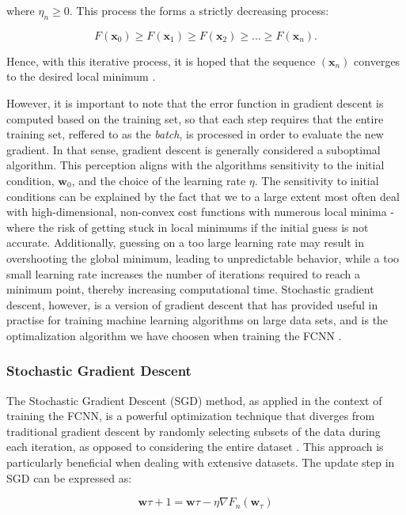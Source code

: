 \documentclass[a4paper, UKenglish, 11pt]{uiomaster}
\begin{document}
where $\eta_n \ge 0$. This process the forms a strictly decreasing process:

\begin{equation}
F(\textbf{x}_0) \ge F(\textbf{x}_1) \ge F(\textbf{x}_2) \ge ... \ge F(\textbf{x}_n).
\end{equation}

Hence, with this iterative process, it is hoped that the sequence $(\textbf{x}_n)$ converges to the desired local minimum \cite{wiki-gradient-descent}.

However, it is important to note that the error function in gradient descent is computed based on the training set, so that each step requires that the entire training set, reffered to as the \emph{batch}, is processed in order to evaluate the new gradient. In that sense, gradient descent is generally considered a suboptimal algorithm. This perception aligns with the algorithms sensitivity to the initial condition, $\textbf{w}_0$, and the choice of the learning rate $\eta$. The sensitivity to initial conditions can be explained by the fact that we to a large extent most often deal with high-dimensional, non-convex cost functions with numerous local minima - where the risk of getting stuck in local minimums if the initial guess is not accurate. Additionally, guessing on a too large learning rate may result in overshooting the global minimum, leading to unpredictable behavior, while a too small learning rate increases the number of iterations required to reach a minimum point, thereby increasing computational time. Stochastic gradient descent, however, is a version of gradient descent that has provided useful in practise for training machine learning algorithms on large data sets, and is the optimalization algorithm we have choosen when training the FCNN \cite{bishop2006pattern}.

\subsubsection{Stochastic Gradient Descent}
The Stochastic Gradient Descent (SGD) method, as applied in the context of training the FCNN, is a powerful optimization technique that diverges from traditional gradient descent by randomly selecting subsets of the data during each iteration, as opposed to considering the entire dataset \cite{bishop2006pattern}. This approach is particularly beneficial when dealing with extensive datasets. The update step in SGD can be expressed as:

\begin{equation}
\textbf{w}{\tau+1} = \textbf{w}{\tau} - \eta\nabla F_n(\textbf{w}_\tau)
\end{equation}
\end{document}
